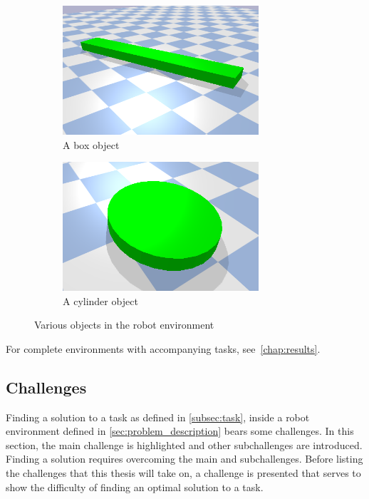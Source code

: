 \begin{figure}[H]
    \centering
    \begin{subfigure}{.5\textwidth}
    \centering
    \includegraphics[width=0.8\textwidth]{figures/box_object.png}
    \caption{A box object}
    \end{subfigure}%
    \begin{subfigure}{.5\textwidth}
    \centering
    \includegraphics[width=0.8\textwidth]{figures/cylinder_object.png}
    \caption{A cylinder object}
    \end{subfigure}%
    \caption{Various objects in the robot environment}%
    \label{fig:example_objects}
\end{figure}

For complete environments with accompanying tasks, see~\cref{chap:results}.\bs

\subsection{Challenges}%
\label{subsection:problems_with_task_planning}
Finding a solution to a task as defined in \cref{subsec:task}, inside a robot environment defined in \cref{sec:problem_description} bears some challenges. In this section, the main challenge is highlighted and other subchallenges are introduced. Finding a solution requires overcoming the main and subchallenges. Before listing the challenges that this thesis will take on, a challenge is presented that serves to show the difficulty of finding an optimal solution to a task.\bs

